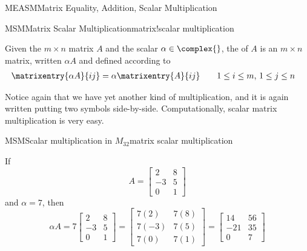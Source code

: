 \begin{subsect}{MEASM}{Matrix Equality, Addition, Scalar Multiplication}
%
\begin{definition}{MSM}{Matrix Scalar Multiplication}{matrix!scalar multiplication}
\begin{para}Given the $m\times n$ matrix $A$
and the scalar $\alpha\in\complex{\null}$, the  of $A$ is an $m\times n$ matrix, written $\alpha A$ and defined according to
%
\begin{align*}
\matrixentry{\alpha A}{ij}&=\alpha\matrixentry{A}{ij}&&
\quad 1\leq i\leq m,\,1\leq j\leq n
\end{align*}
\end{para}
%
\end{definition}
%
\begin{para}Notice again that we have yet another kind of multiplication, and it is again written putting two symbols side-by-side.  Computationally, scalar matrix multiplication is very easy.\end{para}
%
\begin{example}{MSM}{Scalar multiplication in $M_{32}$}{matrix scalar multiplication}
\begin{para}If
%
\begin{equation*}
A=
\begin{bmatrix}
2&8\\
-3&5\\0&1
\end{bmatrix}
\end{equation*}
%
and $\alpha=7$, then
%
\begin{equation*}
\alpha A=
7\begin{bmatrix}2&8\\-3&5\\0&1\end{bmatrix}=
\begin{bmatrix}7(2)&7(8)\\7(-3)&7(5)\\7(0)&7(1)\end{bmatrix}=
\begin{bmatrix}14&56\\-21&35\\0&7\end{bmatrix}
\end{equation*}
\end{para}
%
\end{example}
%
%
\end{subsect}
%
